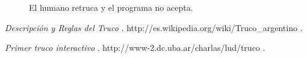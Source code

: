 \documentclass[12pt,a4paper]{article}
\begin{document}
\begin{figure}
\noindent {}
\caption {El humano retruca y el programa no acepta.}
\end{figure}


\begin{thebibliography}{9}

	 \emph{Descripci\'on y Reglas del Truco }. 
	http://es.wikipedia.org/wiki/Truco\_argentino .

	 \emph{Primer truco interactivo }. 
	http://www-2.dc.uba.ar/charlas/lud/truco .


\end{thebibliography}
\end{document}
